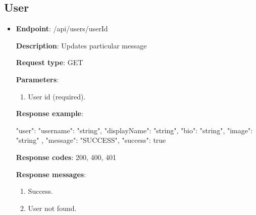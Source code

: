 \subsection{User}\label{subsec:user}
\begin{itemize}
    \item \textbf{Endpoint}: /api/users/{userId}

    \textbf{Description}: Updates particular message

    \textbf{Request type}: GET

    \textbf{Parameters}:

    \begin{enumerate}
        \item User id (required).
    \end{enumerate}

    \textbf{Response example}:

    \begin{spverbatim}
    {
        "user": {
        "username": "string",
        "displayName": "string",
        "bio": "string",
        "image": "string"
    },
        "message": "SUCCESS",
        "success": true
    }
    \end{spverbatim}

    \textbf{Response codes}: 200, 400, 401

    \textbf{Response messages}:
    \begin{enumerate}
        \item Success.
        \item User not found.
    \end{enumerate}
\end{itemize}